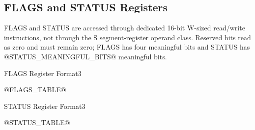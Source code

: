 \subsection{FLAGS and STATUS Registers}
FLAGS and STATUS are accessed through dedicated 16-bit W-sized read/write instructions, not through the S
segment-register operand class. Reserved bits read as zero and must remain zero; FLAGS has four meaningful
bits and STATUS has @STATUS_MEANINGFUL_BITS@ meaningful bits.

\begin{manuallistedformatdiagram}{FLAGS Register Format}{3}
\end{manuallistedformatdiagram}


@FLAGS_TABLE@

\begin{manuallistedformatdiagram}{STATUS Register Format}{3}
\end{manuallistedformatdiagram}


@STATUS_TABLE@
